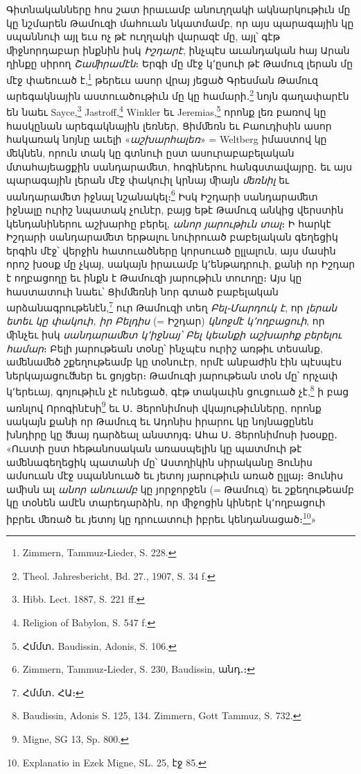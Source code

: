 \documentclass{article}
\begin{document}
{Գիտնականները հոս շատ իրաւամբ անուղղակի ակնարկութիւն մը կը նշմարեն Թամուզի մահուան նկատմամբ, որ այս պարագային կը սպաննուի այլ եւս ոչ թէ ուղղակի վարազէ մը, այլ՝ գէթ ﬕջնորդաբար ինքնին իսկ \emph{Իշդարէ}, ինչպէս աւանդական հայ Արան ղինքը սիրող \emph{Շաﬕրամէն}։ Երգի մը մէջ կ՚ըսուի թէ Թամուզ լերան մը մէջ փաեուած է,\footnote{Zimmern, Tammuz֊Lieder, S. 228.} թերեւս ասոր վրայ յեցած Գրեսման Թամուզ արեգակնային աստուածութիւն մը կը համարի․\footnote{Theol. Jahresbericht, Bd. 27., 1907, S. 34 f.} նոյն գաղափարէն են նաեւ Sayce,\footnote{Hibb. Lect. 1887, S. 221 ff.} Jastroff,\footnote{Religion of Babylon, S. 547 f.} Winkler եւ Jeremias,\footnote{Հմմտ․ Baudissin, Adonis, S. 106.} որոնք լեռ բառով կը հասկընան արեգակնային լեռներ, Ցիմﬔռն եւ Բաուդիսին ասոր հակառակ նոյնը աւելի «\emph{աշխարհալեռ}» = Weltberg իմաստով կը ﬔկնեն, որուն տակ կը գտնուի ըստ ասուրաբաբելական մտահայեացքին սանդարաﬔտ, հոգիներու հանգստավայրը․ եւ այս պարագային լերան մէջ փակուիլ կրնայ ﬕայն \emph{ﬔռնիլ} եւ սանդարաﬔտ իջնալ նշանակել։\footnote{Zimmern, Tammuz֊Lieder, S. 230, Baudissin, անդ․։} Իսկ Իշդարի սանդարաﬔտ իջնալը ուրիշ նպատակ չունէր, բայց եթէ Թամուզ անկից վերստին կենդանիներու աշխարհը բերել, \emph{անոր յարութիւն տալ}։ Ի հարկէ Իշդարի սանդարաﬔտ երթալու նուիրուած բաբելական գեղեցիկ երգին մէջ՝ վերջին հատուածները կորսուած ըլլալուն, այս մասին որոշ խօսք մը չկայ, սակայն իրաւամբ կ՚ենթադրուի, քանի որ Իշդար է ողբացողը եւ ինքն է Թամուզի յարութիւն տուողը։ Այս կը հաստատուի նաեւ՝ Ցիմﬔռնի նոր գտած բաբելական արձանագրութենէն,\footnote{Հմմտ․ ՀԱ։} ուր Թամուզի տեղ \emph{Բել֊Մարդուկ է}, որ \emph{լերան ետեւ կը փակուի, իր Բելդիս} (= Իշդար) \emph{կնոջմէ կ՚ողբացուի}, որ ﬕնչեւ իսկ \emph{սանդարաﬔտ կ՚իջնայ՝ Բել կեանքի աշխարհք բերելու համար}։ Բելի յարութեան տօնը՝ ինչպէս ուրիշ առթիւ տեսանք, աﬔնաﬔծ շքեղութեամբ կը տօնուէր, որմէ անբաժին էին պէսպէս ներկայացուﬓեր եւ ցոյցեր։ Թամուզի յարութեան տօն մը՝ որչափ կ՚երեւայ, գոյութիւն չէ ունեցած, գէթ տակաւին ցուցուած չէ,\footnote{Baudissin, Adonis S. 125, 134. Zimmern, Gott Tammuz, S. 732.} ի բաց առնլով Որոգինէսի\footnote{Migne, SG 13, Sp. 800.} եւ Ս․ Յերոնիմոսի վկայութիւնները, որոնք սակայն քանի որ Թամուզ եւ Ադոնիս իրարու կը նոյնացընեն խնդիրը կը ﬓայ դարձեալ անստոյգ։ Ահա Ս․ Յերոնիմոսի խօսքը․ «Ուստի ըստ հեթանոսական առասպելին կը պատմուի թէ աﬔնագեղեցիկ պատանի մը՝ Աստղիկին սիրականը Յունիս ամսուան մէջ սպաննուած եւ յետոյ յարութիւն առած ըլլայ։ Յունիս աﬕսն ալ \emph{անոր անուամբ} կը յորջորջեն (= Թամուզ) եւ շքեղութեամբ կը տօնեն ամէն տարեդարձին, որ ﬕջոցին կիներէ կ՚ողբացուի իբրեւ ﬔռած եւ յետոյ կը դրուատուի իբրեւ կենդանացած։\footnote{Explanatio in Ezek Migne, SL. 25, էջ 85.}»

}
\end{document}
